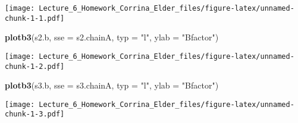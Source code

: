 \documentclass[]{article}
\newenvironment{Shaded}{\begin{snugshade}}{\end{snugshade}}
\newcommand{\KeywordTok}[1]{\textcolor[rgb]{0.13,0.29,0.53}{\textbf{#1}}}
\newcommand{\DataTypeTok}[1]{\textcolor[rgb]{0.13,0.29,0.53}{#1}}
\newcommand{\StringTok}[1]{\textcolor[rgb]{0.31,0.60,0.02}{#1}}
\newcommand{\OperatorTok}[1]{\textcolor[rgb]{0.81,0.36,0.00}{\textbf{#1}}}
\newcommand{\NormalTok}[1]{#1}
\begin{document}
\begin{Shaded}
\end{Shaded}

\texttt{[image: Lecture\_6\_Homework\_Corrina\_Elder\_files/figure-latex/unnamed-chunk-1-1.pdf]}

\begin{Shaded}
\begin{Highlighting}[]
\KeywordTok{plotb3}\NormalTok{(s2.b, }\DataTypeTok{sse =}\NormalTok{ s2.chainA, }\DataTypeTok{typ =} \StringTok{"l"}\NormalTok{, }\DataTypeTok{ylab =} \StringTok{"Bfactor"}\NormalTok{)}
\end{Highlighting}
\end{Shaded}

\texttt{[image: Lecture\_6\_Homework\_Corrina\_Elder\_files/figure-latex/unnamed-chunk-1-2.pdf]}

\begin{Shaded}
\begin{Highlighting}[]
\KeywordTok{plotb3}\NormalTok{(s3.b, }\DataTypeTok{sse =}\NormalTok{ s3.chainA, }\DataTypeTok{typ =} \StringTok{"l"}\NormalTok{, }\DataTypeTok{ylab =} \StringTok{"Bfactor"}\NormalTok{)}
\end{Highlighting}
\end{Shaded}

\texttt{[image: Lecture\_6\_Homework\_Corrina\_Elder\_files/figure-latex/unnamed-chunk-1-3.pdf]}
\end{document}
